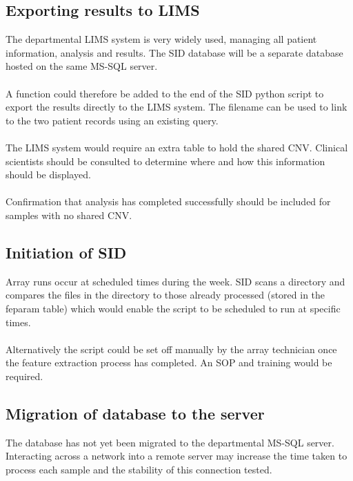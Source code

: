 \subsection{Exporting results to LIMS}
The departmental \ac{LIMS} system is very widely used, managing all patient information, analysis and results. The SID database will be a separate database hosted on the same MS-SQL server. 
\paragraph*{}
A function could therefore be added to the end of the SID python script to export the results directly to the LIMS system. The filename can be used to link to the two patient records using an existing query.
\paragraph*{}
The LIMS system would require an extra table to hold the shared CNV. Clinical scientists should be consulted to determine where and how this information should be displayed.
\paragraph*{}
Confirmation that analysis has completed successfully should be included for samples with no shared CNV.

\subsection{Initiation of SID}
Array runs occur at scheduled times during the week. SID scans a directory and compares the files in the directory to those already processed (stored in the feparam table) which would enable the script to be scheduled to run at specific times.
\paragraph*{}
Alternatively the script could be set off manually by the array technician once the feature extraction process has completed. An SOP and training would be required.

\subsection{Migration of database to the server}
The database has not yet been migrated to the departmental MS-SQL server. Interacting across a network into a remote server may increase the time taken to process each sample and the stability of this connection tested.
